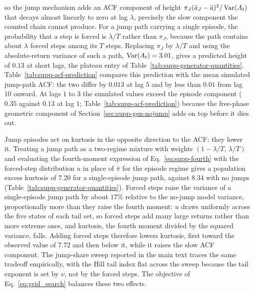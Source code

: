 so the jump mechanism adds an ACF component of height $\pi_J (\bar a_J
- \bar a)^2 / \operatorname{Var}(A_t)$ that decays almost linearly to zero at lag
$\lambda$, precisely the slow component the counted chain cannot
produce. For a jump path carrying a single episode, the probability
that a step is forced is $\lambda / T$ rather than $\pi_J$, because
the path contains about $\lambda$ forced steps among its $T$ steps.
Replacing $\pi_J$ by $\lambda / T$ and using the absolute-return
variance of such a path, $\operatorname{Var}(A_t) = 3.01$, gives a predicted height
of $0.13$ at short lags, the plateau entry of
Table~\ref{tab:supp-generator-quantities}.
Table~\ref{tab:supp-acf-prediction} compares
this prediction with the mean simulated jump-path ACF: the two differ
by $0.013$ at lag $5$ and by less than $0.01$ from lag $10$ onward. At lags $1$ to $3$ the
simulated values exceed the episode component ($0.35$ against $0.13$
at lag $1$; Table~\ref{tab:supp-acf-prediction}) because the free-phase geometric component of
Section~\ref{sec:supp-gen-nojump} adds on top before it dies out.

\begin{table}[tbp]
\centering
\caption{\textbf{Episode-overlap prediction of the jump-path
    absolute-return autocorrelation function (ACF) against
    simulation.} The prediction evaluates
    Eq.~\eqref{eq:supp-acf-wj} at the fitted SPY values with the
    single-episode forced fraction $\lambda/T$ in place of $\pi_J$
    and the same-episode probability $h(\tau)$ of
    Eq.~\eqref{eq:supp-h}. The simulated column is the mean ACF of
    $|G_t|$ over the $99$ jump-active paths among $400$ simulated
    in-sample-length paths. The free-phase component of
    Eq.~\eqref{eq:supp-acf-nj} is excluded from the prediction; it
    has decayed below $0.01$ from lag $5$ onward.}
\label{tab:supp-acf-prediction}
\small

\end{table}

Jump episodes act on kurtosis in the opposite direction to the ACF:
they lower it. Treating a jump path as a two-regime mixture with
weights $(1 - \lambda/T,\, \lambda/T)$ and evaluating the
fourth-moment expression of Eq.~\eqref{eq:supp-fourth} with the
forced-step distribution $u$ in place of $\bar\pi$ for the episode
regime gives a population excess kurtosis of $7.20$ for a
single-episode jump path, against $8.34$ with no jumps
(Table~\ref{tab:supp-generator-quantities}). Forced steps raise the
variance of a single-episode jump path by about $17\%$ relative to
the no-jump model variance, proportionally more than they raise the
fourth moment: $u$ draws uniformly across the five states of each
tail set, so forced steps add many large returns rather than more
extreme ones, and kurtosis, the fourth moment divided by the squared
variance, falls. Adding forced steps therefore lowers kurtosis, first
toward the observed value of $7.72$ and then below it, while it
raises the slow ACF component. The jump-share sweep reported in the
main text traces the same tradeoff empirically, with the Hill tail
index flat across the sweep because the tail exponent is set by
$\nu$, not by the forced steps. The objective of
Eq.~\eqref{eq:grid_search} balances these two effects.

